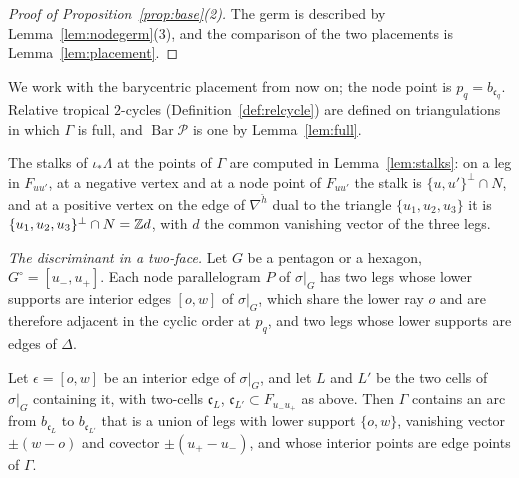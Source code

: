 \begin{proof}[Proof of Proposition~\ref{prop:base}(2)]
The germ is described by Lemma~\ref{lem:nodegerm}(3), and the comparison of the two placements is
Lemma~\ref{lem:placement}.
\end{proof}

We work with the barycentric placement from now on; the node point is $p_q=b_{\mathfrak c_q}$. Relative tropical $2$-cycles
(Definition~\ref{def:relcycle}) are defined on triangulations in which $\Gamma$ is full, and $\operatorname{Bar}\mathscr P$ is
one by Lemma~\ref{lem:full}.


The stalks of $\iota_*\Lambda$ at the points of $\Gamma$ are computed in Lemma~\ref{lem:stalks}: on a leg in $F_{uu'}$, at a
negative vertex and at a node point of $F_{uu'}$ the stalk is $\{u,u'\}^\perp\cap N$, and at a positive vertex on the edge of
$\nabla^{\check h}$ dual to the triangle $\{u_1,u_2,u_3\}$ it is $\{u_1,u_2,u_3\}^\perp\cap N=\mathbb Z d$, with $d$ the common vanishing vector of
the three legs.

\emph{The discriminant in a two-face.} Let $G$ be a pentagon or a hexagon, $G^\circ=[u_-,u_+]$. Each node parallelogram $P$ of
$\sigma|_G$ has two legs whose lower supports are interior edges $[o,w]$ of $\sigma|_G$, which share the lower ray $o$ and are therefore
adjacent in the cyclic order at $p_q$, and two legs whose lower supports are edges of $\Delta$.

\begin{lemma}\label{lem:dualarc}
Let $\epsilon=[o,w]$ be an interior edge of $\sigma|_G$, and let $L$ and $L'$ be the two cells of $\sigma|_G$ containing it, with
two-cells $\mathfrak c_L$, $\mathfrak c_{L'}\subset F_{u_-u_+}$ as above. Then $\Gamma$ contains an arc from $b_{\mathfrak c_L}$ to
$b_{\mathfrak c_{L'}}$ that is a union of legs with lower support $\{o,w\}$, vanishing vector $\pm(w-o)$ and covector $\pm(u_+-u_-)$,
and whose interior points are edge points of $\Gamma$.
\end{lemma}

